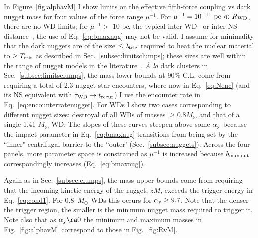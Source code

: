 \documentclass[
    twocolumn,
	prd,
        amssymb,
	preprintnumbers,
	secnumarabic,
	nofootinbib,
	superscriptaddress]{revtex4-1}
\begin{document}
In Figure~\ref{fig:alphavM} I show limits on the effective fifth-force coupling vs dark nugget mass for four values of the force range $\mu^{-1}$.
For $\mu^{-1} = 10^{-11} \ {\rm pc} \ll R_{\rm WD}$, there are no WD limits; for $\mu^{-1} >$ 10 pc, the typical inter-WD~\cite{WDdistribs:Napiwotzki} or inter-NS distance~\cite{NSdistribs:BlaesMadau,NSdistribs:Sartore2010}, the use of Eq.~\eqref{eq:bmaxnug} may not be valid.   
I assume for minimality that the dark nuggets are of the size $\leq \lambda_{\rm trig}$ required to heat the nuclear material to $\geq T_{\rm crit}$ as described in Sec.~\ref{subsec:limitsclumps}; these sizes are well within the range of nugget models in the literature~\cite{BaiLongLunuggets:2018dxf,BlobsGrabowska:2018lnd,nuggetsGresham:2017cvl,GreshamLeeZurek:2022biw}.
{\em \`{A} la} dark clusters in Sec.~\ref{subsec:limitsclumps}, the mass lower bounds at 90\% C.L. come from requiring a total of 2.3 nugget-star encounters, where now in Eq.~\eqref{eq:Nenc} (and its NS equivalent with $\tau_{\rm WD} \to t_{\rm recur}$) I use the encounter rate in Eq.~\eqref{eq:encounterratenugget}.
For WDs I show two cases corresponding to different nugget sizes: destroyal of all WDs of masses $\geq 0.8 M_\odot$ and that of a single 1.41 $M_\odot$ WD.
The slopes of these curves steepen above some $\alpha_{\rm y}$ because the impact parameter in Eq.~\eqref{eq:bmaxnug} transitions from being set by the ``inner" centrifugal barrier to the ``outer" (Sec.~\ref{subsec:nuggets}).
Across the four panels, more parameter space is constrained as $\mu^{-1}$ is increased because $b_{\rm max, out}$ correspondingly increases (Eq.~\eqref{eq:bmaxnug}).

Again as in Sec.~\ref{subsec:clumps}, the mass upper bounds come from requiring that the incoming kinetic energy of the nugget, $\tilde z M$, exceeds the trigger energy in Eq.~\eqref{eq:cond1}.  
For 0.8~$M_\odot$ WDs this occurs for $\alpha_{\rm y} \geq 9.7$.
Note that the denser the trigger region, the smaller is the minimum nugget mass required to trigger it.
Note also that as $\alpha_{\rm y} \ra 0$ the minimum and maximum masses in Fig.~\ref{fig:alphavM} correspond to those in Fig.~\ref{fig:RvM}.
\end{document}
